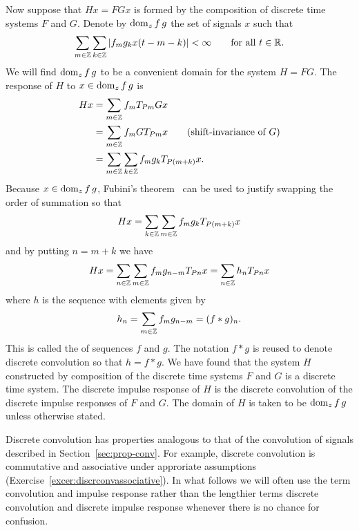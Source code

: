 Now suppose that $Hx = F Gx$ is formed by the composition of discrete time systems $F$ and $G$.  Denote by $\operatorname{dom}_z f\,g$ the set of signals $x$ such that
\[
\sum_{m \in {\mathbb Z}} \sum_{k \in {\mathbb Z}} \left\vert f_m g_k x(t - m - k) \right\vert < \infty \qquad \text{for all $t \in {\mathbb R}$}. 
\]  
We will find $\operatorname{dom}_z f\,g$ to be a convenient domain for the system $H = FG$.  The response of $H$ to $x \in \operatorname{dom}_z f\,g$ is
\begin{align*}
H x &= \sum_{m \in {\mathbb Z}} f_m T_{Pm} G x  \\
&= \sum_{m \in {\mathbb Z}} f_m  G T_{Pm} x  \qquad \text{(shift-invariance of $G$)} \\
&= \sum_{m \in {\mathbb Z}} \sum_{k \in {\mathbb Z}} f_m g_k T_{P(m+k)}x.
\end{align*}
Because $x \in \operatorname{dom}_z f\,g$, Fubini's theorem~\cite[Theorem~8.8]{Rudin_real_and_complex_analysis} can be used to justify swapping the order of summation so that
\[
H x = \sum_{k \in {\mathbb Z}} \sum_{m \in {\mathbb Z}} f_m g_k T_{P(m+k)}x
\]
and by putting $n = m+k$ we have
\begin{align}
Hx =  \sum_{n \in {\mathbb Z}} \sum_{m \in {\mathbb Z}} f_m g_{n-m} T_{Pn}x = \sum_{n \in {\mathbb Z}} h_n T_{Pn}x \nonumber
\end{align}
where $h$ is the sequence with elements given by
\[
h_n = \sum_{m \in {\mathbb Z}} f_m g_{n-m} = (f * g)_n .
\]
This is called the  of sequences $f$ and $g$.  The notation $f * g$ is reused to denote discrete convolution so that $h = f * g$.  We have found that the system $H$ constructed by composition of the discrete time systems $F$ and $G$ is a discrete time system.  The discrete impulse response of $H$ is the discrete convolution of the discrete impulse responses of $F$ and $G$.  The domain of $H$ is taken to be $\operatorname{dom}_z f\,g$ unless otherwise stated.  

Discrete convolution has properties analogous to that of the convolution of signals described in Section~\ref{sec:prop-conv}.  For example, discrete convolution is commutative and associative under approriate assumptions (Exercise~\ref{excer:discrconvassociative}).
In what follows we will often use the term convolution and impulse response rather than the lengthier terms discrete convolution and discrete impulse response whenever there is no chance for confusion.

